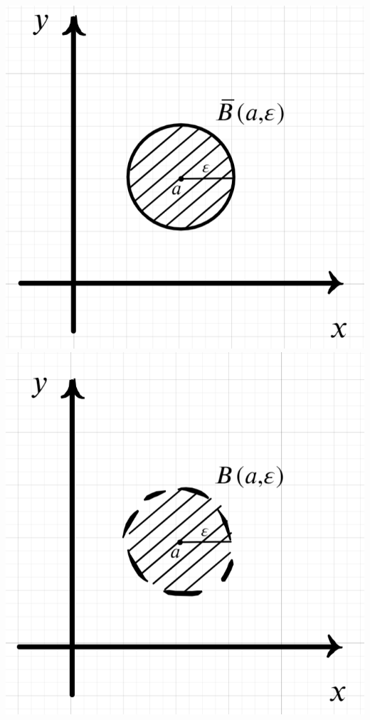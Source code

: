 \documentclass[a4paper, 12pt]{article}
\begin{document}
\begin{center}
	\includegraphics[scale=0.3]{images/010.png}\qquad\qquad\qquad\qquad
	\includegraphics[scale=0.3]{images/011.png}
\end{center}
\end{document}
